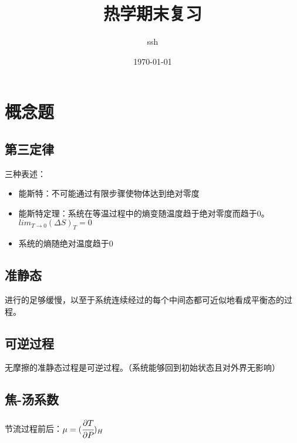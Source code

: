 \documentclass[a4paper,12pt]{article}
\title{热学期末复习}
\author{ssh}
\date{\today}
\newcommand{\myp}[3]{(\cfrac{\partial{#1}}{\partial{#2}})_{#3}}
\begin{document}
\maketitle


\section{概念题}
\subsection{第三定律}
三种表述：
\begin{itemize}
\item 能斯特：不可能通过有限步骤使物体达到绝对零度
\item 能斯特定理：系统在等温过程中的熵变随温度趋于绝对零度而趋于0。\\$lim_{T \rightarrow 0}(\Delta S)_{T} = 0$
\item 系统的熵随绝对温度趋于0
\end{itemize}

\subsection{准静态}
进行的足够缓慢，以至于系统连续经过的每个中间态都可近似地看成平衡态的过程。
\subsection{可逆过程}
无摩擦的准静态过程是可逆过程。（系统能够回到初始状态且对外界无影响）
\subsection{焦-汤系数}
节流过程前后：$\mu = \myp{T}{P}{H}$
\end{document}
